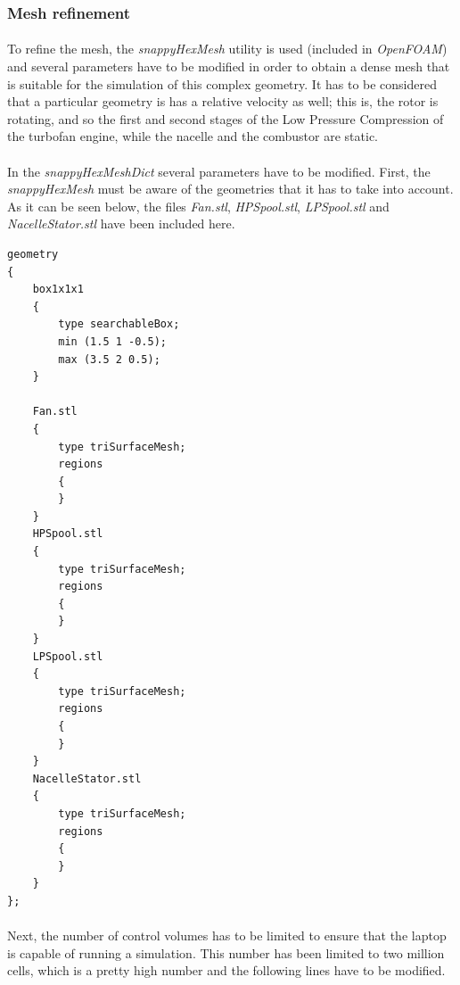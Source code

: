 \subsubsection{Mesh refinement}

\paragraph{}To refine the mesh, the \textit{snappyHexMesh} utility is used (included in \textit{OpenFOAM}) and several parameters have to be modified in order to obtain a dense mesh that is suitable for the simulation of this complex geometry. It has to be considered that a particular geometry is has a relative velocity as well; this is, the rotor is rotating, and so the first and second stages of the Low Pressure Compression of the turbofan engine, while the nacelle and the combustor are static. 

\paragraph{}In the \textit{snappyHexMeshDict} several parameters have to be modified. First, the \textit{snappyHexMesh} must be aware of the geometries that it has to take into account. As it can be seen below, the files \textit{Fan.stl}, \textit{HPSpool.stl}, \textit{LPSpool.stl} and \textit{NacelleStator.stl} have been included here.

\begin{footnotesize}
\begin{verbatim}
geometry
{
    box1x1x1
    {
        type searchableBox;
        min (1.5 1 -0.5);
        max (3.5 2 0.5);
    }

    Fan.stl
    {
        type triSurfaceMesh;
        regions
        {
        }
    }
    HPSpool.stl
    {
        type triSurfaceMesh;
        regions
        {
        }
    }
    LPSpool.stl
    {
        type triSurfaceMesh;
        regions
        {
        }
    }
    NacelleStator.stl
    {
        type triSurfaceMesh;
        regions
        {
        }
    }
};
\end{verbatim}
\end{footnotesize}

\paragraph{}Next, the number of control volumes has to be limited to ensure that the laptop is capable of running a simulation. This number has been limited to two million cells, which is a pretty high number and the following lines have to be modified.

